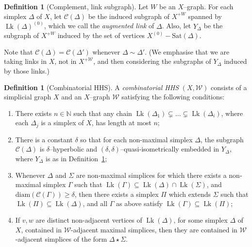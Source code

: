 \documentclass[svgnames]{amsart}
\theoremstyle{plain}
\theoremstyle{definition}
\newtheorem{defn}[thm]{Definition}
\newcommand{\diam}{\mathrm{diam}}
\newcommand{\C}{\mathcal C}
\newcommand{\link}{\operatorname{Lk}}
\newcommand{\duaug}[2]{{#1}^{+{#2}}}
\newcommand{\Sat}{\mathrm{Sat}}
\newcommand{\W}{\mathcal{W}}
\begin{document}
\begin{defn}[Complement, link subgraph]\label{defn:complement}
Let $W$ be an $X$--graph.  For each simplex $\Delta$ of $X$, let $\C(\Delta)$ be the induced subgraph of $\duaug{X}{W}$ spanned by $\link(\Delta)^{(0)}$, which we call the \emph{augmented link} of $\Delta$. Also, let $Y_\Delta$ be the subgraph of $\duaug{X}{W}$ induced by the set of vertices $X^{(0)}-\Sat(\Delta)$.
\end{defn}

Note that $\C  (\Delta)=\C  (\Delta')$ whenever $\Delta\sim\Delta'$. (We emphasise that we are taking links in $X$, not in $\duaug{X}{\W}$, and then considering the subgraphs of $Y_\Delta$ induced by those links.)



\begin{defn}[Combinatorial HHS]\label{defn:combinatorial_HHS}
A \emph{combinatorial HHS} $(X,\W)$ consists of a simplicial graph $X$ and an $X$--graph $\W$ satisfying the following conditions:
\begin{enumerate}
    \item \label{item:chhs_flag} There exists $n\in\mathbb N$ such that any chain $\link(\Delta_1)\subsetneq\dots\subsetneq\link(\Delta_i)$, where each $\Delta_j$ is a simplex of $X$, has length at most $n$;
    \item \label{item:chhs_delta} There is a constant $\delta$ so that for each non-maximal simplex $\Delta$, the subgraph $\C  (\Delta)$ is $\delta$--hyperbolic and $(\delta,\delta)$--quasi-isometrically embedded in $Y_\Delta$, where $Y_\Delta$ is as in Definition~\ref{defn:complement};
    \item \label{item:chhs_join} Whenever $\Delta$ and $\Sigma$ are non-maximal simplices for which there exists a non-maximal simplex $\Gamma$ such that $\link(\Gamma)\subseteq\link(\Delta)\cap \link(\Sigma)$, and $\diam(\C   (\Gamma))\geq \delta$, then there exists a simplex $\Pi$ which extends $\Sigma$ such that $\link(\Pi)\subseteq \link(\Delta)$, and all $\Gamma$ as above satisfy $\link(\Gamma)\subseteq\link(\Pi)$;
    \item \label{item:C_0=C} If $v,w$ are distinct non-adjacent vertices of $\link(\Delta)$, for some simplex $\Delta$ of $X$, contained in $\W$-adjacent maximal simplices, then they are contained in $\W$-adjacent simplices of the form $\Delta\star\Sigma$.
\end{enumerate}
\end{defn}
\end{document}
